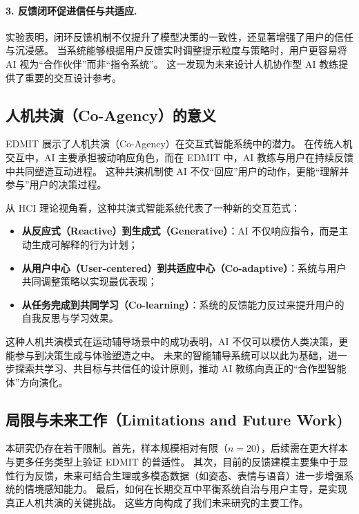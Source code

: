 \documentclass[sigconf]{acmart}
\begin{document}
\paragraph{3. 反馈闭环促进信任与共适应.}
实验表明，闭环反馈机制不仅提升了模型决策的一致性，还显著增强了用户的信任与沉浸感。  
当系统能够根据用户反馈实时调整提示粒度与策略时，用户更容易将 AI 视为“合作伙伴”而非“指令系统”。  
这一发现为未来设计人机协作型 AI 教练提供了重要的交互设计参考。


\subsection{人机共演（Co-Agency）的意义}

\textsc{EDMIT} 展示了人机共演（Co-Agency）在交互式智能系统中的潜力。  
在传统人机交互中，AI 主要承担被动响应角色，而在 \textsc{EDMIT} 中，AI 教练与用户在持续反馈中共同塑造互动进程。  
这种共演机制使 AI 不仅“回应”用户的动作，更能“理解并参与”用户的决策过程。

从 HCI 理论视角看，这种共演式智能系统代表了一种新的交互范式：
\begin{itemize}
  \item \textbf{从反应式（Reactive）到生成式（Generative）}：AI 不仅响应指令，而是主动生成可解释的行为计划；
  \item \textbf{从用户中心（User-centered）到共适应中心（Co-adaptive）}：系统与用户共同调整策略以实现最优表现；
  \item \textbf{从任务完成到共同学习（Co-learning）}：系统的反馈能力反过来提升用户的自我反思与学习效果。
\end{itemize}

这种人机共演模式在运动辅导场景中的成功表明，AI 不仅可以模仿人类决策，更能参与到决策生成与体验塑造之中。  
未来的智能辅导系统可以以此为基础，进一步探索共学习、共目标与共信任的设计原则，推动 AI 教练向真正的“合作型智能体”方向演化。


\subsection{局限与未来工作（Limitations and Future Work)}

本研究仍存在若干限制。首先，样本规模相对有限（$n=20$），后续需在更大样本与更多任务类型上验证 \textsc{EDMIT} 的普适性。  
其次，目前的反馈建模主要集中于显性行为反馈，未来可结合生理或多模态数据（如姿态、表情与语音）进一步增强系统的情境感知能力。  
最后，如何在长期交互中平衡系统自治与用户主导，是实现真正人机共演的关键挑战。  
这些方向构成了我们未来研究的主要工作。
\end{document}
